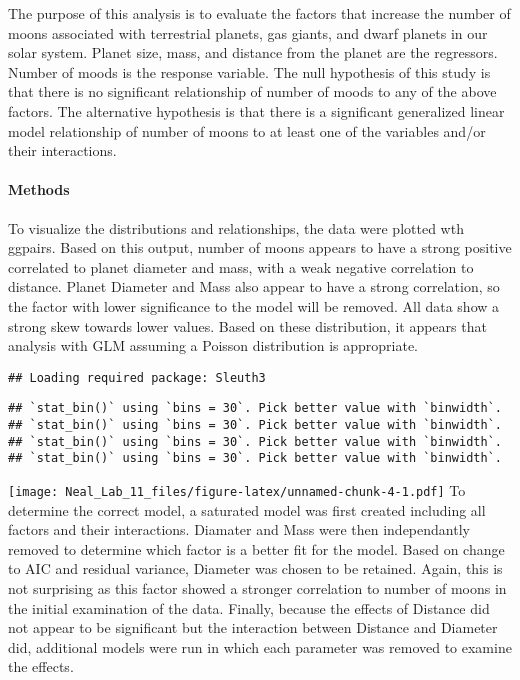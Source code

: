 \documentclass[]{article}
\let\oldparagraph\paragraph
\renewcommand{\paragraph}[1]{\oldparagraph{#1}\mbox{}}
\begin{document}
The purpose of this analysis is to evaluate the factors that increase
the number of moons associated with terrestrial planets, gas giants, and
dwarf planets in our solar system. Planet size, mass, and distance from
the planet are the regressors. Number of moods is the response variable.
The null hypothesis of this study is that there is no significant
relationship of number of moods to any of the above factors. The
alternative hypothesis is that there is a significant generalized linear
model relationship of number of moons to at least one of the variables
and/or their interactions.

\paragraph{Methods}\label{methods-1}

To visualize the distributions and relationships, the data were plotted
wth ggpairs. Based on this output, number of moons appears to have a
strong positive correlated to planet diameter and mass, with a weak
negative correlation to distance. Planet Diameter and Mass also appear
to have a strong correlation, so the factor with lower significance to
the model will be removed. All data show a strong skew towards lower
values. Based on these distribution, it appears that analysis with GLM
assuming a Poisson distribution is appropriate.

\begin{verbatim}
## Loading required package: Sleuth3
\end{verbatim}

\begin{verbatim}
## `stat_bin()` using `bins = 30`. Pick better value with `binwidth`.
## `stat_bin()` using `bins = 30`. Pick better value with `binwidth`.
## `stat_bin()` using `bins = 30`. Pick better value with `binwidth`.
## `stat_bin()` using `bins = 30`. Pick better value with `binwidth`.
\end{verbatim}

\texttt{[image: Neal\_Lab\_11\_files/figure-latex/unnamed-chunk-4-1.pdf]}
To determine the correct model, a saturated model was first created
including all factors and their interactions. Diamater and Mass were
then independantly removed to determine which factor is a better fit for
the model. Based on change to AIC and residual variance, Diameter was
chosen to be retained. Again, this is not surprising as this factor
showed a stronger correlation to number of moons in the initial
examination of the data. Finally, because the effects of Distance did
not appear to be significant but the interaction between Distance and
Diameter did, additional models were run in which each parameter was
removed to examine the effects.
\end{document}
